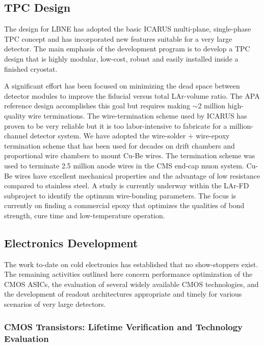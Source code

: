\subsection{TPC Design}
The design for LBNE has adopted the basic ICARUS multi-plane, single-phase TPC
concept and has incorporated new features suitable for a very large
detector.  The main emphasis of the development program is to develop a TPC design that is highly modular, low-cost, robust and easily installed inside a finished cryostat.

A significant effort has been focused on minimizing the dead space between detector modules to improve
the fiducial versus total LAr-volume ratio. The APA reference design accomplishes this goal but requires making $\sim$2 million high-quality wire terminations. The wire-termination scheme used by ICARUS has proven to be very reliable but it is too labor-intensive to fabricate for a million-channel detector system. We have adopted the wire-solder + wire-epoxy termination scheme that has been used for decades on drift chambers and proportional wire chambers to mount Cu-Be wires. The termination scheme was used to terminate 2.5 million  anode wires in the CMS end-cap muon system. Cu-Be wires have excellent mechanical properties and the advantage of low resistance compared to stainless steel. A study is currently underway within the LAr-FD subproject to identify the optimum wire-bonding parameters. The focus is currently on finding a commercial epoxy that optimizes the qualities of bond strength, cure time and low-temperature operation.

 \subsection{Electronics Development}
 
 The work to-date on cold electronics has established that no show-stoppers exist. The remaining activities outlined here concern performance optimization of the CMOS ASICs, the evaluation of several widely available CMOS technologies, and the development of readout architectures appropriate and timely for various scenarios of very large detectors.

\subsubsection{CMOS Transistors: Lifetime Verification and Technology Evaluation}

